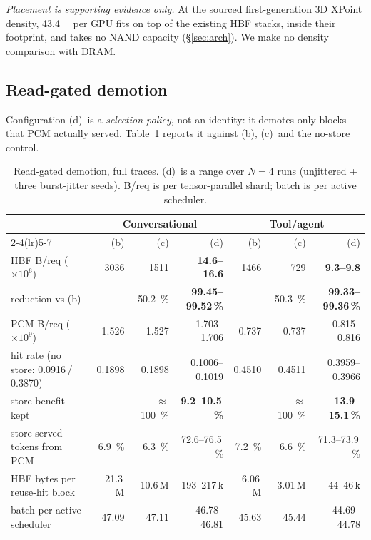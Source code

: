 \documentclass[conference]{IEEEtran}
\newcommand{\cfgb}{\textsf{(b)}}
\newcommand{\cfgc}{\textsf{(c)}}
\newcommand{\cfgd}{\textsf{(d)}}
\begin{document}
\emph{Placement is supporting evidence only.} At the sourced first-generation
3D XPoint density, \SI{43.4}{\gibi\byte} per GPU fits on top of the existing
HBF stacks, inside their footprint, and takes no NAND capacity
(\S\ref{sec:arch}). We make no density comparison with DRAM.

\subsection{Read-gated demotion}\label{sec:headline}
Configuration \cfgd\ is a \emph{selection policy}, not an identity: it demotes
only blocks that PCM actually served. Table~\ref{tab:headline} reports it
against \cfgb, \cfgc\ and the no-store control.

\begin{table}[t]
\centering
\caption{Read-gated demotion, full traces. \cfgd\ is a range over $N=4$ runs
(unjittered + three burst-jitter seeds). B/req is per tensor-parallel shard;
batch is per active scheduler.}
\label{tab:headline}
\small
\begin{tabular}{lrrrrrr}
\toprule
 & \multicolumn{3}{c}{\textbf{Conversational}} & \multicolumn{3}{c}{\textbf{Tool/agent}} \\
\cmidrule(lr){2-4}\cmidrule(lr){5-7}
 & \cfgb & \cfgc & \cfgd & \cfgb & \cfgc & \cfgd \\
\midrule
HBF B/req ($\times10^{6}$) & 3036 & 1511 & \textbf{14.6--16.6} & 1466 & 729 & \textbf{9.3--9.8} \\
reduction vs \cfgb & --- & \SI{50.2}{\percent} & \textbf{99.45--99.52\,\%} & --- & \SI{50.3}{\percent} & \textbf{99.33--99.36\,\%} \\
PCM B/req ($\times10^{9}$) & 1.526 & 1.527 & 1.703--1.706 & 0.737 & 0.737 & 0.815--0.816 \\
hit rate (no store: 0.0916\,/\,0.3870) & 0.1898 & 0.1898 & 0.1006--0.1019 & 0.4510 & 0.4511 & 0.3959--0.3966 \\
store benefit kept & --- & ${\approx}$\SI{100}{\percent} & \textbf{9.2--10.5\,\%} & --- & ${\approx}$\SI{100}{\percent} & \textbf{13.9--15.1\,\%} \\
store-served tokens from PCM & \SI{6.9}{\percent} & \SI{6.3}{\percent} & 72.6--76.5\,\% & \SI{7.2}{\percent} & \SI{6.6}{\percent} & 71.3--73.9\,\% \\
HBF bytes per reuse-hit block & 21.3\,M & 10.6\,M & 193--217\,k & 6.06\,M & 3.01\,M & 44--46\,k \\
batch per active scheduler & 47.09 & 47.11 & 46.78--46.81 & 45.63 & 45.44 & 44.69--44.78 \\
\bottomrule
\end{tabular}
\end{table}
\end{document}
